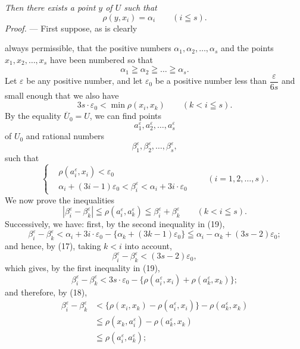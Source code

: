 \documentclass[a4paper,12pt]{amsart}
\newcommand{\srcpage}[1]{} %
\begin{document}
\textit{Then there exists a point $y$ of $U$ such that}
\[
\rho(y,x_i)=\alpha_i\qquad(i\leqq s).
\]
\textit{Proof.} --- First suppose, as is clearly
\srcpage{59}
always permissible, that the positive numbers $\alpha_1,\alpha_2,\dots,\alpha_s$ and the points $x_1,x_2,\dots,x_s$ have been numbered so that
\begin{equation}\tag{17}
\alpha_1\geqq\alpha_2\geqq\dots\geqq\alpha_s.
\end{equation}
Let $\varepsilon$ be any positive number, and let $\varepsilon_0$ be a positive number less than $\dfrac{\varepsilon}{6s}$ and small enough that we also have
\begin{equation}\tag{18}
3s\cdot\varepsilon_0<\min\rho(x_i,x_k)\qquad(k<i\leqq s).
\end{equation}
By the equality $\overline{U}_0=U$, we can find points
\[
a_1^\varepsilon,a_2^\varepsilon,\dots,a_s^\varepsilon
\]
of $U_0$ and rational numbers
\[
\beta_1^\varepsilon,\beta_2^\varepsilon,\dots,\beta_s^\varepsilon,
\]
such that
\begin{equation}\tag{19}
\left\{\begin{aligned}
&\rho(a_i^\varepsilon,x_i)<\varepsilon_0\\
&\alpha_i+(3i-1)\varepsilon_0<\beta_i^\varepsilon<\alpha_i+3i\cdot\varepsilon_0
\end{aligned}\right.\qquad(i=1,2,\dots,s).
\end{equation}
We now prove the inequalities
\begin{equation}\tag{$\Delta^*_\varepsilon$}
|\beta_i^\varepsilon-\beta_k^\varepsilon|\leqq\rho(a_i^\varepsilon,a_k^\varepsilon)
\leqq\beta_i^\varepsilon+\beta_k^\varepsilon\qquad(k<i\leqq s).
\end{equation}
Successively, we have: first, by the second inequality in (19),
\[
\beta_i^\varepsilon-\beta_k^\varepsilon
<\alpha_i+3i\cdot\varepsilon_0-\{\alpha_k+(3k-1)\varepsilon_0\}
\leqq\alpha_i-\alpha_k+(3s-2)\varepsilon_0;
\]
and hence, by (17), taking $k<i$ into account,
\[
\beta_i^\varepsilon-\beta_k^\varepsilon<(3s-2)\varepsilon_0,
\]
which gives, by the first inequality in (19),
\[
\beta_i^\varepsilon-\beta_k^\varepsilon<3s\cdot\varepsilon_0
-\{\rho(a_i^\varepsilon,x_i)+\rho(a_k^\varepsilon,x_k)\};
\]
and therefore, by (18),
\begin{equation}\tag{20}
\begin{aligned}
\beta_i^\varepsilon-\beta_k^\varepsilon
&<\{\rho(x_i,x_k)-\rho(a_i^\varepsilon,x_i)\}-\rho(a_k^\varepsilon,x_k)\\
&\leqq\rho(x_k,a_i^\varepsilon)-\rho(a_k^\varepsilon,x_k)\\
&\leqq\rho(a_i^\varepsilon,a_k^\varepsilon);
\end{aligned}
\end{equation}
\end{document}
